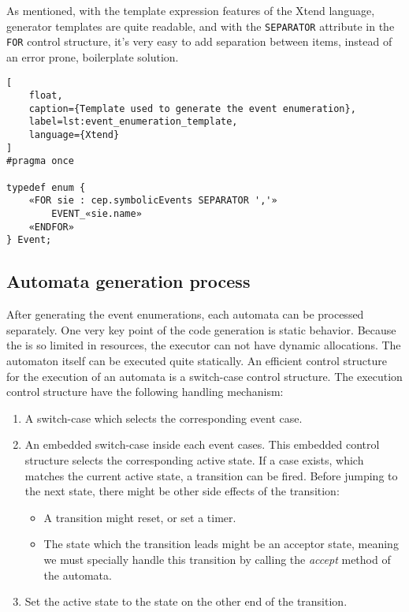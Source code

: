As mentioned, with the template expression features of the Xtend language, generator templates are quite readable, and with the \texttt{SEPARATOR} attribute in the \texttt{FOR} control structure, it's very easy to add separation between items, instead of an error prone, boilerplate solution.

\begin{lstlisting}[
	float,
	caption={Template used to generate the event enumeration},
	label=lst:event_enumeration_template,
	language={Xtend}
]
#pragma once

typedef enum {
	«FOR sie : cep.symbolicEvents SEPARATOR ','»
		EVENT_«sie.name»
	«ENDFOR»
} Event;
\end{lstlisting}

\subsection{Automata generation process}

\needspace{5ex}
After generating the event enumerations, each automata can be processed separately. One very key point of the \cpp{} code generation is static behavior. Because the \pru{} is so limited in resources, the executor can not have dynamic allocations. The automaton itself can be executed quite statically. An efficient control structure for the execution of an automata is a switch-case control structure. The execution control structure have the following handling mechanism:
\begin{enumerate}
	\item A switch-case which selects the corresponding event case.
	\item An embedded switch-case inside each event cases. This embedded control structure selects the corresponding active state. If a case exists, which matches the current active state, a transition can be fired. Before jumping to the next state, there might be other side effects of the transition:
	\begin{itemize}
		\item A transition might reset, or set a timer.
		\item The state which the transition leads might be an acceptor state, meaning we must specially handle this transition by calling the \emph{accept} method of the automata.
	\end{itemize}
	\item Set the active state to the state on the other end of the transition.
\end{enumerate}

